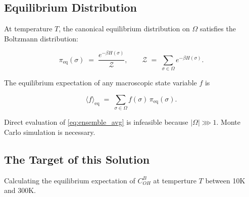 \documentclass[12pt, a4paper]{article}
\theoremstyle{definition}
\newcommand{\COH}{C_\mathrm{OH}^B}
\newcommand{\Eeps}{\varepsilon}
\newcommand{\betaT}{\beta}
\newcommand{\avgE}[1]{\langle #1 \rangle}
\newcommand{\Peq}{\pi_\mathrm{eq}}
\newcommand{\ZZ}{\mathcal{Z}}
\begin{document}






\subsection{Equilibrium Distribution}

\hfill

At temperature $T$, the canonical equilibrium distribution on $\Omega$ satisfies the Boltzmann distribution:

\begin{equation}
    \Peq(\sigma) \;=\; \frac{e^{-\betaT H(\sigma)}}{\ZZ},
    \qquad
    \ZZ \;=\; \sum_{\sigma \in \Omega} e^{-\betaT H(\sigma)}.
    \label{eq:boltzmann}
\end{equation}

The equilibrium expectation of any macroscopic state variable $f$ is

\begin{equation}
    \avgE{f}_{\mathrm{eq}} \;=\; \sum_{\sigma \in \Omega}
    f(\sigma)\,\Peq(\sigma).
    \label{eq:ensemble_avg}
\end{equation}

Direct evaluation of \eqref{eq:ensemble_avg} is infeasible because
$|\Omega| \ggg 1$.
Monte Carlo simulation is necessary.

\subsection{The Target of this Solution}

\hfill

Calculating the equilibrium expectation of $C_{OH}^B$ at temperture $T$ between 10K and 300K.


\newpage 
\end{document}
